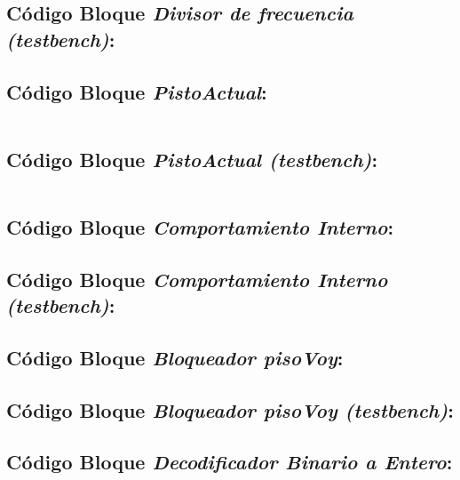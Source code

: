 \subsection{Código Bloque \textit{Divisor de frecuencia (testbench)}:} \label{code:DivisorFrecuencia_Tb}

\subsection{Código Bloque \textit{PistoActual}:} \label{code:PisoActual}
    \inputminted[frame=lines,fontsize=\footnotesize,linenos]{vhdl}{CodeFiles/PisoActual.vhd}
    
\subsection{Código Bloque \textit{PistoActual (testbench)}:} \label{code:PisoActual_tb}
    \inputminted[frame=lines,fontsize=\footnotesize,linenos]{vhdl}{CodeFiles/PisoActual_tb.vhd}
    
\subsection{Código Bloque \textit{Comportamiento Interno}:} \label{code:ComportamientoInterno}

\subsection{Código Bloque \textit{Comportamiento Interno (testbench)}:} \label{code:ComportamientoInterno_tb}

\subsection{Código Bloque \textit{Bloqueador pisoVoy}:} \label{code:BloqueadorpisoVoy}

\subsection{Código Bloque \textit{Bloqueador pisoVoy (testbench)}:} \label{code:BloqueadorpisoVoy_tb}

\subsection{Código Bloque \textit{Decodificador Binario a Entero}:} \label{code:DecodificadorBinarioEntero}
    \inputminted[frame=lines,fontsize=\footnotesize,linenos]{vhdl}{CodeFiles/DecodificadorBinarioEntero.vhd}
    
